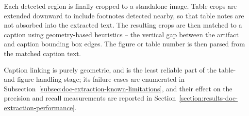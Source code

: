 Each detected region is finally cropped to a standalone image. Table crops are extended downward to include footnotes detected nearby, so that table notes are not absorbed into the extracted text. The resulting crops are then matched to a caption using geometry-based heuristics -- the vertical gap between the artifact and caption bounding box edges. The figure or table number is then parsed from the matched caption text. 

Caption linking is purely geometric, and is the least reliable part of the table-and-figure handling stage; its failure cases are enumerated in Subsection~\ref{subsec:doc-extraction-known-limitations}, and their effect on the precision and recall measurements are reported in Section~\ref{section:results-doc-extraction-performance}.